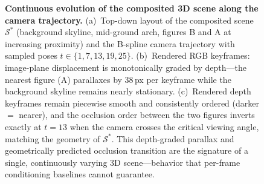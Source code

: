 \begin{figure}[t]
{}
    \caption{\textbf{Continuous evolution of the composited 3D scene
    along the camera trajectory.} (a)~Top-down layout of the composited
    scene $\mathcal{S}^{*}$ (background skyline, mid-ground arch,
    figures B and A at increasing proximity) and the B-spline camera
    trajectory with sampled poses $t \in \{1,7,13,19,25\}$.
    (b)~Rendered RGB keyframes: image-plane displacement is
    monotonically graded by depth---the nearest figure (A) parallaxes
    by $38$\,px per keyframe while the background skyline remains
    nearly stationary. (c)~Rendered depth keyframes remain
    piecewise smooth and consistently ordered (darker $=$ nearer), and
    the occlusion order between the two figures inverts exactly at
    $t{=}13$ when the camera crosses the critical viewing angle,
    matching the geometry of $\mathcal{S}^{*}$. This depth-graded
    parallax and geometrically predicted occlusion transition are the
    signature of a single, continuously varying 3D scene---behavior
    that per-frame conditioning baselines cannot guarantee.}
    \label{fig:scene_evolution}
\end{figure}


